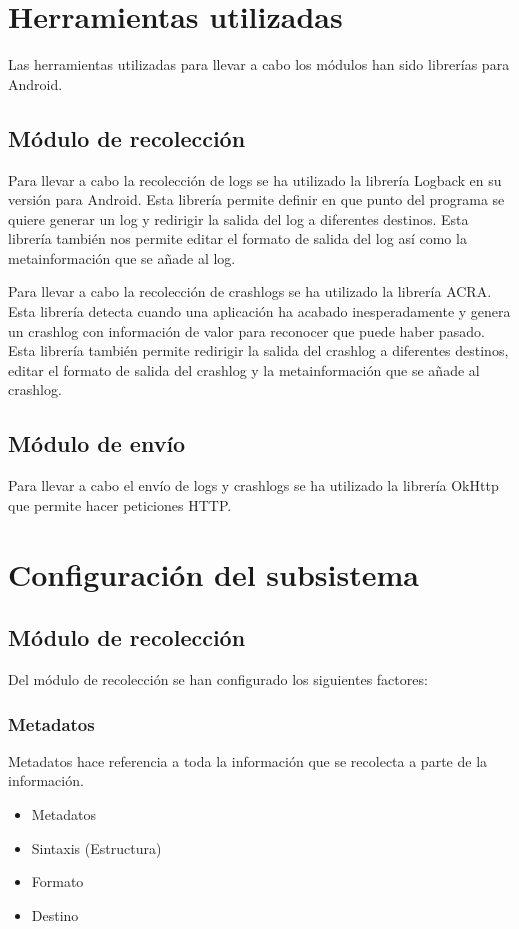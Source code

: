 \section{Herramientas utilizadas}

Las herramientas utilizadas para llevar a cabo los módulos han sido librerías para Android.

\subsection{Módulo de recolección}
Para llevar a cabo la recolección de logs se ha utilizado la librería Logback\cite{Tfg:logbackandroid} en su versión para Android. Esta librería permite definir en que punto del programa se quiere generar un log y redirigir la salida del log a diferentes destinos. Esta librería también nos permite editar el formato de salida del log así como la metainformación que se añade al log.

Para llevar a cabo la recolección de crashlogs se ha utilizado la librería ACRA\cite{Tfg:acra}. Esta librería detecta cuando una aplicación ha acabado inesperadamente y genera un crashlog con información de valor para reconocer que puede haber pasado. Esta librería también permite redirigir la salida del crashlog a diferentes destinos, editar el formato de salida del crashlog y la metainformación que se añade al crashlog.

\subsection{Módulo de envío}
Para llevar a cabo el envío de logs y crashlogs se ha utilizado la librería OkHttp\cite{Tfg:okhttp} que permite hacer peticiones HTTP. %

\section{Configuración del subsistema}

\subsection{Módulo de recolección}


Del módulo de recolección se han configurado los siguientes factores:

\subsubsection{Metadatos}
Metadatos hace referencia a toda la información que se recolecta a parte de la información.


\begin{itemize}
	\item Metadatos
	\item Sintaxis (Estructura) %
	\item Formato %
	\item Destino %
\end{itemize}














